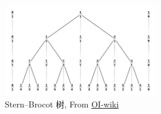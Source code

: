 \begin{figure}[h]
    \centering
    \includegraphics[width=0.6\textwidth]{img/stern-brocot1.png}
    \caption{Stern–Brocot 树, From \href{https://oi-wiki.org/math/number-theory/stern-brocot}{OI-wiki}}
\end{figure}
